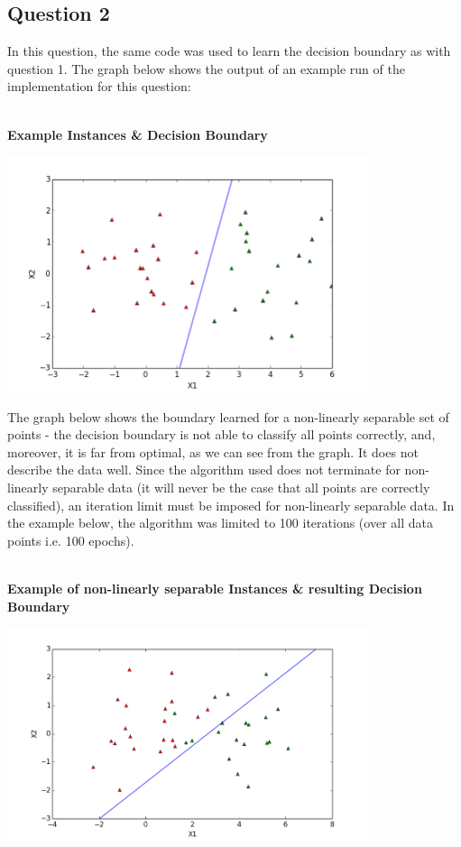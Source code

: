 \documentclass{article}
\begin{document}
\subsection*{Question 2}
In this question, the same code was used to learn the decision boundary as with question 1. The graph below shows the output of an example run of the implementation for this question: \\\\
\centerline{\textbf{Example Instances \& Decision Boundary}}
\centerline{\includegraphics[width=400px]{partA2_1}}

\noindent The graph below shows the boundary learned for a non-linearly separable set of points - the decision boundary is not able to classify all points correctly, and, moreover, it is far from optimal, as we can see from the graph. It does not describe the data well. Since the algorithm used does not terminate for non-linearly separable data (it will never be the case that all points are correctly classified), an iteration limit must be imposed for non-linearly separable data. In the example below, the algorithm was limited to 100 iterations (over all data points i.e. 100 epochs). \\\\
\centerline{\textbf{Example of non-linearly separable Instances \& resulting Decision Boundary}}
\centerline{\includegraphics[width=400px]{partA2_2}}
\vspace{6mm}
\end{document}
